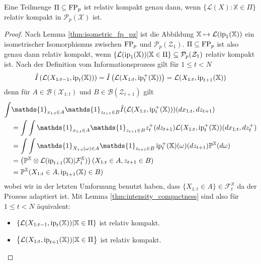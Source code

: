 \begin{theorem}
    Eine Teilmenge $\Pi \subseteq \operatorname{FP}_p$ ist relativ kompakt genau dann, wenn $\{\mathcal{L}(X): \mathbb{X} \in \Pi\}$ relativ kompakt in $\mathcal{P}_p(\mathcal{X})$ ist.
\end{theorem}
\begin{proof}
    Nach Lemma \ref{thm:isometric_fp_pz} ist die Abbildung $\mathbb{X} \mapsto \mathcal{L}(\operatorname{ip}_1(\mathbb{X}))$ ein isometrischer Isomorphismus zwischen $\operatorname{FP}_p$ und $\mathcal{P}_p(\mathcal{Z}_1)$. $\Pi \subseteq \operatorname{FP}_p$ ist also genau dann relativ kompakt, wenn $\left\{\mathcal{L}(\operatorname{ip}_1(\mathbb{X})) \vert \mathbb{X} \in \Pi\right\} \subseteq \mathcal{P}_p(\mathcal{Z}_1)$ relativ kompakt ist. Nach der Definition vom Informationsprozess gilt für $1\leq t < N$
    $$\hat{I}\left(\mathcal{L}(X_{1:t-1}, \operatorname{ip}_t(\mathbb{X}))\right) = \hat{I}\left(\mathcal{L}(X_{1:t}, \operatorname{ip}_t^+(\mathbb{X}))\right) = \mathcal{L}(X_{1:t}, \operatorname{ip}_{t+1}(\mathbb{X}))$$
    denn für $A \in \mathcal{B}(\mathcal{X}_{1:t})$ und $B \in \mathcal{B}(\mathcal{Z}_{t+1})$ gilt 
    \begin{align*}
        \int &\mathds{1}_{x_{1:t} \in A} \mathds{1}_{z_{t+1} \in B} \hat{I}(\mathcal{L}(X_{1:t}, \ip_t^+(\mathbb{X})))(dx_{1:t}, dz_{t+1}) \\
        &= \int \int \mathds{1}_{x_{1:t} \in A} \mathds{1}_{z_{t+1} \in B} z_t^+(dz_{t+1}) \mathcal{L}(X_{1:t}, \ip_t^+(\mathbb{X}))(dx_{1:t}, dz_t^+) \\
        &= \int \int \mathds{1}_{X_{1:t}(\omega)\in A} \mathds{1}_{z_{t+1} \in B} \ip_t^+(\mathbb{X})(\omega)(dz_{t+1}) \mathbb{P}^\mathbb{X}(d\omega) \\
        &= \left(\mathbb{P}^{\mathbb{X}} \otimes \mathcal{L}(\ip_{t+1}(\mathbb{X}) \vert \mathcal{F}_t^\mathbb{X})\right)(X_{1:t} \in A, z_{t+1} \in B) \\ 
        &= \mathbb{P}^\mathbb{X}(X_{1:t} \in A, \ip_{t+1}(\mathbb{X}) \in B)
    \end{align*}
    wobei wir in der letzten Umformung benutzt haben, dass $\{X_{1:t} \in A\} \in \mathcal{F}_t^\mathbb{X}$ da der Prozess adaptiert ist. Mit Lemma \ref{thm:intensity_compactness} sind also für $1 \leq t < N$ äquivalent:
    \begin{itemize}
        \item $\left\{ \mathcal{L}(X_{1:t-1}, \operatorname{ip}_t(\mathbb{X})) \vert \mathbb{X} \in \Pi\right\}$ ist relativ kompakt. 
        \item $\left\{ \mathcal{L}(X_{1:t}, \operatorname{ip}_{t+1}(\mathbb{X})) \vert \mathbb{X} \in \Pi\right\}$ ist relativ kompakt. 

\end{itemize}
\end{proof}
